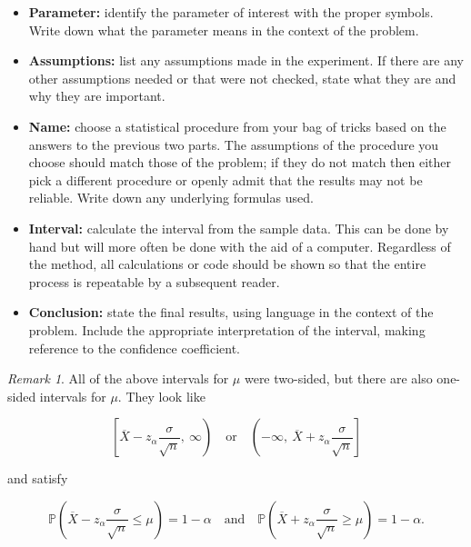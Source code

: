 \documentclass[]{book}
\providecommand{\tightlist}{%
  \setlength{\itemsep}{0pt}\setlength{\parskip}{0pt}}
\numberwithin{equation}{chapter}
\numberwithin{figure}{chapter}
\theoremstyle{plain}
\theoremstyle{definition}
\theoremstyle{remark}
\theoremstyle{definition}
\theoremstyle{definition}
\theoremstyle{remark}
\newtheorem*{remark}{Remark}
\begin{document}
\begin{itemize}
\tightlist
\item
  \textbf{Parameter:} identify the parameter of interest with the proper
  symbols. Write down what the parameter means in the context of the
  problem.
\item
  \textbf{Assumptions:} list any assumptions made in the experiment. If
  there are any other assumptions needed or that were not checked, state
  what they are and why they are important.
\item
  \textbf{Name:} choose a statistical procedure from your bag of tricks
  based on the answers to the previous two parts. The assumptions of the
  procedure you choose should match those of the problem; if they do not
  match then either pick a different procedure or openly admit that the
  results may not be reliable. Write down any underlying formulas used.
\item
  \textbf{Interval:} calculate the interval from the sample data. This
  can be done by hand but will more often be done with the aid of a
  computer. Regardless of the method, all calculations or code should be
  shown so that the entire process is repeatable by a subsequent reader.
\item
  \textbf{Conclusion:} state the final results, using language in the
  context of the problem. Include the appropriate interpretation of the
  interval, making reference to the confidence coefficient.
\end{itemize}

\bigskip

\begin{remark}
All of the above intervals for \(\mu\) were two-sided, but there are
also one-sided intervals for \(\mu\). They look like

\begin{equation}
\left[\overline{X}-z_{\alpha}\frac{\sigma}{\sqrt{n}},\ \infty\right)\quad \mbox{or}\quad \left(-\infty,\ \overline{X}+z_{\alpha}\frac{\sigma}{\sqrt{n}}\right]
\end{equation}

and satisfy

\begin{equation}
\mathbb{P}\left(\overline{X}-z_{\alpha}\frac{\sigma}{\sqrt{n}}\leq\mu\right)=1-\alpha\quad \mbox{and}\quad \mathbb{P}\left(\overline{X}+z_{\alpha}\frac{\sigma}{\sqrt{n}}\geq\mu\right)=1-\alpha.
\end{equation}
\end{remark}
\end{document}
